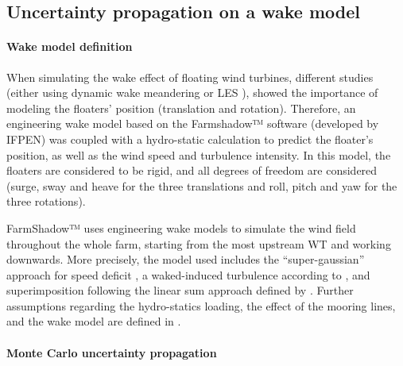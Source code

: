 \subsection{Uncertainty propagation on a wake model}\label{sec:UQ-wake}

\paragraph{Wake model definition}
When simulating the wake effect of floating wind turbines, different studies (either using dynamic wake meandering \cite{wise_2020} or LES \cite{johlas_2020_wake_LES}), showed the importance of modeling the floaters' position (translation and rotation). 
Therefore, an engineering wake model based on the Farmshadow™ software (developed by IFPEN) was coupled with a hydro-static calculation to predict the floater's position, as well as the wind speed and turbulence intensity. 
In this model, the floaters are considered to be rigid, and all degrees of freedom are considered (surge, sway and heave for the three translations and roll, pitch and yaw for the three rotations). 

FarmShadow™ uses engineering wake models to simulate the wind field throughout the whole farm, starting from the most upstream WT and working downwards. 
More precisely, the model used includes the ``super-gaussian'' approach for speed deficit \citep{blondel_2020}, a waked-induced turbulence according to \citet{quian_2018}, and superimposition following the linear sum approach defined by \citet{zong_2020}.    
Further assumptions regarding the hydro-statics loading, the effect of the mooring lines, and the wake model are defined in \citet{lovera_fekhari_2023}.


\paragraph{Monte Carlo uncertainty propagation}

